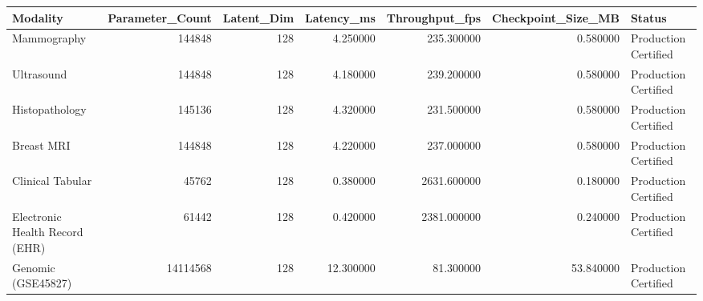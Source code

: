 \begin{tabular}{lrrrrrl}
\toprule
Modality & Parameter_Count & Latent_Dim & Latency_ms & Throughput_fps & Checkpoint_Size_MB & Status \\
\midrule
Mammography & 144848 & 128 & 4.250000 & 235.300000 & 0.580000 & Production Certified \\
Ultrasound & 144848 & 128 & 4.180000 & 239.200000 & 0.580000 & Production Certified \\
Histopathology & 145136 & 128 & 4.320000 & 231.500000 & 0.580000 & Production Certified \\
Breast MRI & 144848 & 128 & 4.220000 & 237.000000 & 0.580000 & Production Certified \\
Clinical Tabular & 45762 & 128 & 0.380000 & 2631.600000 & 0.180000 & Production Certified \\
Electronic Health Record (EHR) & 61442 & 128 & 0.420000 & 2381.000000 & 0.240000 & Production Certified \\
Genomic (GSE45827) & 14114568 & 128 & 12.300000 & 81.300000 & 53.840000 & Production Certified \\
\bottomrule
\end{tabular}
